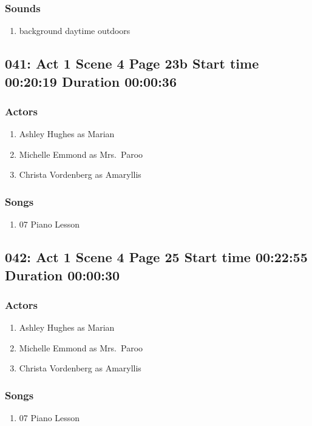 \subsubsection{Sounds}
\begin{enumerate}
\item background daytime outdoors
\end{enumerate}
\subsection{041: Act 1 Scene 4 Page 23b Start time 00:20:19 Duration 00:00:36}

\subsubsection{Actors}
\begin{enumerate}
\item Ashley Hughes as Marian
\item Michelle Emmond as Mrs.~Paroo
\item Christa Vordenberg as Amaryllis
\end{enumerate}

\subsubsection{Songs}
\begin{enumerate}
\item 07 Piano Lesson
\end{enumerate}
\subsection{042: Act 1 Scene 4 Page 25 Start time 00:22:55 Duration 00:00:30}

\subsubsection{Actors}
\begin{enumerate}
\item Ashley Hughes as Marian
\item Michelle Emmond as Mrs.~Paroo
\item Christa Vordenberg as Amaryllis
\end{enumerate}

\subsubsection{Songs}
\begin{enumerate}
\item 07 Piano Lesson
\end{enumerate}
